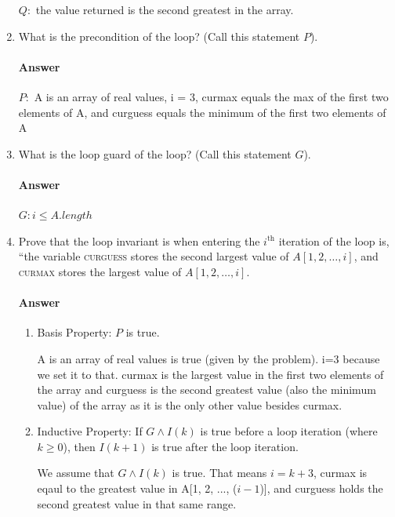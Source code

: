 \documentclass{article}
\begin{document}
\begin{enumerate}
        $Q\colon$ the value returned is the second greatest in the array.

    \item What is the precondition of the loop? (Call this statement $P$).

        \paragraph{Answer}

       $P\colon$ A is an array of real values, i = 3, curmax equals the max of the first two elements of A, and curguess equals the minimum of the first two elements of A

    \item What is the loop guard of the loop? (Call this statement $G$).

        \paragraph{Answer}

        $G\colon i \leq A.length$

    \item Prove that the loop invariant is when entering the $i^\text{th}$
        iteration of the loop is, ``the variable \textsc{curguess} stores
        the second
        largest value of $A[1,2, \ldots, i]$,
        and \textsc{curmax} stores the largest value of $A[1,2,\ldots, i]$.

        \paragraph{Answer}
\begin{enumerate}
	\item Basis Property: $P$ is true.
	
	A is an array of real values is true (given by the problem). i=3 because we set it to that. curmax is the largest value in the first two elements of the array and curguess is the second greatest value (also the minimum value) of the array as it is the only other value besides curmax.
	
	\item Inductive Property: If $G \land I(k)$ is true before a loop iteration (where $k \geq 0$), then $I(k+1)$ is true after the loop iteration.
	
	We assume that $G \land I(k)$ is true. That means $i = k+3$, curmax is eqaul to the greatest value in A[1, 2, ..., ($i-1$)], and curguess holds the second greatest value in that same range.
	

\end{enumerate}
\end{enumerate}
\end{document}
